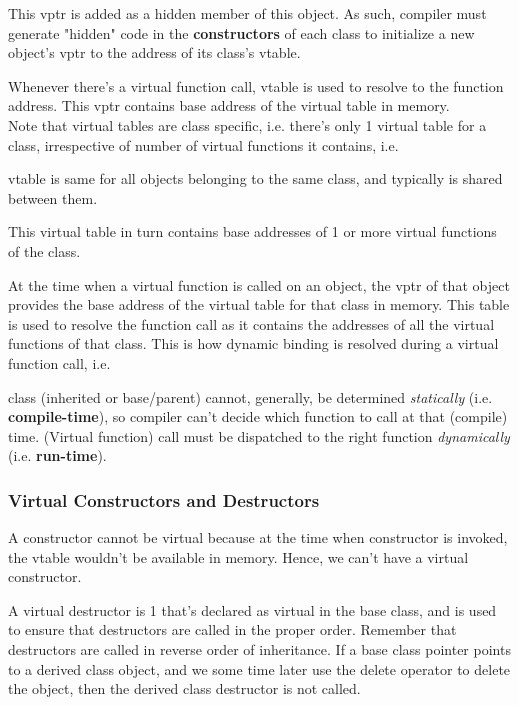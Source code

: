 \documentclass[10pt]{amsart}
\begin{document}
\begin{multicols*}{2}
This vptr is added as a hidden member of this object.  As such, compiler must generate "hidden" code in the \textbf{constructors} of each class to initialize a new object's vptr to the address of its class's vtable.  

Whenever there's a virtual function call, vtable is used to resolve to the function address.  
This vptr contains base address of the virtual table in memory.  \\

Note that virtual tables are class specific, i.e. there's only 1 virtual table for a class, irrespective of number of virtual functions it contains, i.e.  

vtable is same for all objects belonging to the same class, and typically is shared between them.    
  

This virtual table in turn contains base addresses of 1 or more virtual functions of the class.  

At the time when a virtual function is called on an object, the vptr of that object provides the base address of the virtual table for that class in memory.  This table is used to resolve the function call as it contains the addresses of all the virtual functions of that class.  This is how dynamic binding is resolved during a virtual function call, i.e.  

class (inherited or base/parent) cannot, generally, be determined \emph{statically} (i.e. \textbf{compile-time}), so compiler can't decide which function to call at that (compile) time.  (Virtual function) call must be dispatched to the right function \emph{dynamically} (i.e. \textbf{run-time}).  

  

\subsubsection{Virtual Constructors and Destructors}  

A constructor cannot be virtual because at the time when constructor is invoked, the vtable wouldn't be available in memory.  Hence, we can't have a virtual constructor.  

A virtual destructor is 1 that's declared as virtual in the base class, and is used to ensure that destructors are called in the proper order.  Remember that destructors are called in reverse order of inheritance.  If a base class pointer points to a derived class object, and we some time later use the delete operator to delete the object, then the derived class destructor is not called.  


\end{multicols*}
\end{document}
